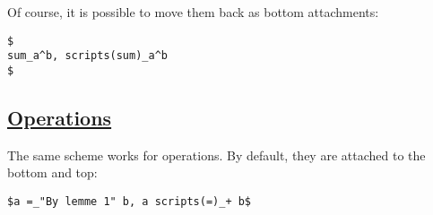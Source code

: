 \pandocbounded{}

Of course, it is possible to move them back as bottom attachments:

\begin{verbatim}
$
sum_a^b, scripts(sum)_a^b
$
\end{verbatim}

\pandocbounded{}

\subsection{\texorpdfstring{\hyperref[operations]{Operations}}{Operations}}\label{operations}

The same scheme works for operations. By default, they are attached to
the bottom and top:

\begin{verbatim}
$a =_"By lemme 1" b, a scripts(=)_+ b$
\end{verbatim}

\pandocbounded{}
